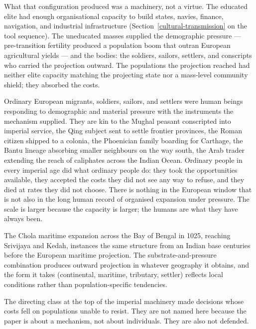 \documentclass[12pt,letterpaper]{article}
\begin{document}
What that configuration produced was a machinery, not a virtue. The
educated elite had enough organisational capacity to build states,
navies, finance, navigation, and industrial infrastructure
(Section~\ref{cultural-transmission} on the tool sequence). The
uneducated masses supplied the demographic pressure --- pre-transition
fertility produced a population boom that outran European agricultural
yields --- and the bodies: the soldiers, sailors, settlers, and
conscripts who carried the projection outward. The populations the
projection reached had neither elite capacity matching the projecting
state nor a mass-level community shield; they absorbed the costs.

Ordinary European migrants, soldiers, sailors, and settlers were human
beings responding to demographic and material pressure with the
instruments the mechanism supplied. They are kin to the Mughal peasant
conscripted into imperial service, the Qing subject sent to settle
frontier provinces, the Roman citizen shipped to a colonia, the
Phoenician family boarding for Carthage, the Bantu lineage absorbing
smaller neighbours on the way south, the Arab trader extending the
reach of caliphates across the Indian Ocean. Ordinary people in every
imperial age did what ordinary people do: they took the opportunities
available, they accepted the costs they did not see any way to refuse,
and they died at rates they did not choose. There is nothing in the
European window that is not also in the long human record of organised
expansion under pressure. The scale is larger because the capacity is
larger; the humans are what they have always been.

The Chola maritime expansion across the Bay of Bengal in 1025,
reaching Srivijaya and Kedah, instances the same structure from an
Indian base centuries before the European maritime projection. The
substrate-and-pressure combination produces outward projection in
whatever geography it obtains, and the form it takes (continental,
maritime, tributary, settler) reflects local conditions rather than
population-specific tendencies.

The directing class at the top of the imperial machinery made
decisions whose costs fell on populations unable to resist. They are
not named here because the paper is about a mechanism, not about
individuals. They are also not defended.
\end{document}

